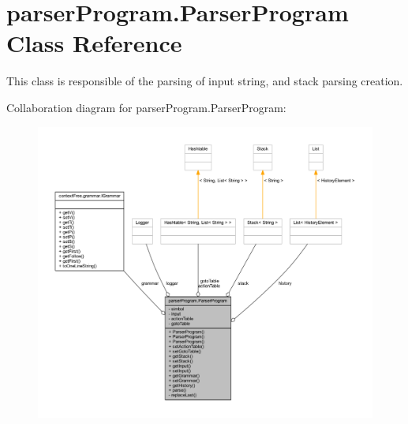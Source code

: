 \hypertarget{classparser_program_1_1_parser_program}{\section{parser\-Program.\-Parser\-Program Class Reference}
\label{classparser_program_1_1_parser_program}
}


This class is responsible of the parsing of input string, and stack parsing creation.  




Collaboration diagram for parser\-Program.\-Parser\-Program\-:
\nopagebreak
\begin{figure}[H]
\begin{center}
\leavevmode
\includegraphics[width=350pt]{classparser_program_1_1_parser_program__coll__graph}
\end{center}
\end{figure}
